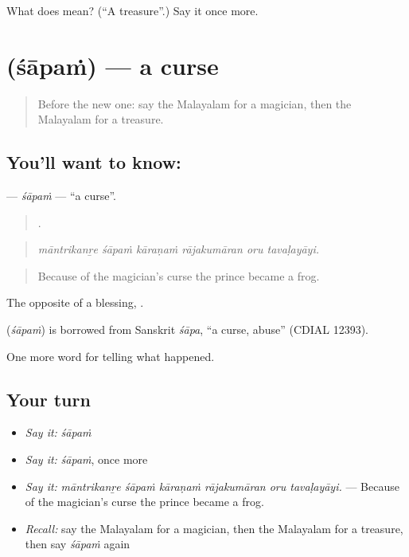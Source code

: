 \begin{tcolorbox}[breakable,colback=teal!4,colframe=teal!35!black,title={Before you move on}]
What does  mean? (\textquotedblleft{}A treasure\textquotedblright{}.) Say it once more.
\end{tcolorbox}
\section[\texorpdfstring{\ml{ശാപം} (śāpaṁ)}{ശാപം (śāpaṁ)}]{ (śāpaṁ) — a curse}

\label{lesson:ML-C403-sapam}



\begin{quote}
Before the new one: say the Malayalam for a magician, then the Malayalam for a treasure.
\end{quote}

\subsection*{You'll want to know: }
\textbf{} — \emph{śāpaṁ} — \textquotedblleft{}a curse\textquotedblright{}.

\begin{quote}
     .
\end{quote}

\begin{quote}
\emph{māntrikanṟe śāpaṁ kāraṇaṁ rājakumāran oru tavaḷayāyi.}
\end{quote}

\begin{quote}
Because of the magician's curse the prince became a frog.
\end{quote}

The opposite of a blessing, .

\begin{cousinweb}
\textbf{} (\emph{śāpaṁ}) is borrowed from Sanskrit \emph{śāpa}, \textquotedblleft{}a curse, abuse\textquotedblright{} (CDIAL 12393).
\end{cousinweb}

\begin{grammarlens}[title={What you've built}]
One more word for telling what happened.
\end{grammarlens}

\subsection*{Your turn}
\begin{itemize}
\raggedright
  \item \emph{Say it:} \emph{śāpaṁ}
  \item \emph{Say it:} \emph{śāpaṁ}, once more
  \item \emph{Say it:} \emph{māntrikanṟe śāpaṁ kāraṇaṁ rājakumāran oru tavaḷayāyi.} — Because of the magician's curse the prince became a frog.
  \item \emph{Recall:} say the Malayalam for a magician, then the Malayalam for a treasure, then say \emph{śāpaṁ} again
\end{itemize}

